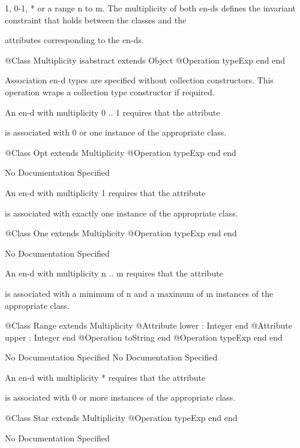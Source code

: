       1, 0-1, * or a range n to m. The multiplicity of both en-ds defines 
      the invariant constraint that holds between the classes and the

      attributes corresponding to the en-ds.
\begin{Interface}
@Class Multiplicity isabstract extends Object
  @Operation typeExp end
end
\end{Interface}

        Association en-d types are specified without collection constructors.
        This operation wraps a collection type constructor if required.

      An en-d with multiplicity 0 .. 1 requires that the attribute

      is associated with 0 or one instance of the appropriate class.
\begin{Interface}
@Class Opt extends Multiplicity
  @Operation typeExp end
end
\end{Interface}
No Documentation Specified

      An en-d with multiplicity 1 requires that the attribute

      is associated with exactly one instance of the appropriate 
      class.
\begin{Interface}
@Class One extends Multiplicity
  @Operation typeExp end
end
\end{Interface}
No Documentation Specified

      An en-d with multiplicity n .. m requires that the attribute

      is associated with a minimum of n and a maximum of m instances 
      of the appropriate class.
\begin{Interface}
@Class Range extends Multiplicity
  @Attribute lower : Integer end
  @Attribute upper : Integer end
  @Operation toString end
  @Operation typeExp end
end
\end{Interface}
No Documentation Specified
No Documentation Specified

      An en-d with multiplicity * requires that the attribute

      is associated with 0 or more instances of the appropriate 
      class.
\begin{Interface}
@Class Star extends Multiplicity
  @Operation typeExp end
end
\end{Interface}
No Documentation Specified

